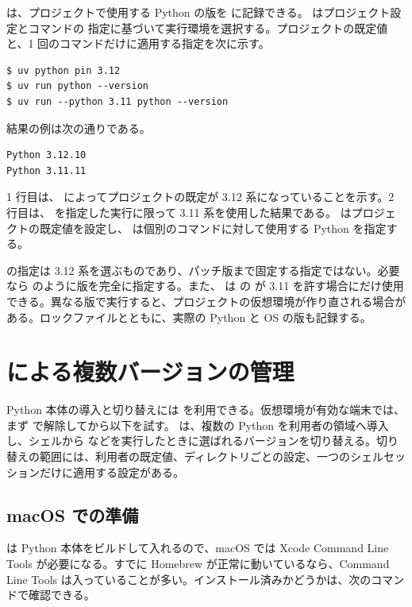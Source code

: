  は、プロジェクトで使用する Python の版を  に記録できる。 はプロジェクト設定とコマンドの  指定に基づいて実行環境を選択する。プロジェクトの既定値と、1 回のコマンドだけに適用する指定を次に示す。

\begin{lstlisting}[numbers=none, xleftmargin=2\zw]
$ uv python pin 3.12
$ uv run python --version
$ uv run --python 3.11 python --version
\end{lstlisting}

結果の例は次の通りである。

\begin{lstlisting}[numbers=none, xleftmargin=2\zw]
Python 3.12.10
Python 3.11.11
\end{lstlisting}

1 行目は、 によってプロジェクトの既定が 3.12 系になっていることを示す。2 行目は、 を指定した実行に限って 3.11 系を使用した結果である。 はプロジェクトの既定値を設定し、 は個別のコマンドに対して使用する Python を指定する。

 の指定は 3.12 系を選ぶものであり、パッチ版まで固定する指定ではない。必要なら  のように版を完全に指定する。また、 は  の  が 3.11 を許す場合にだけ使用できる。異なる版で実行すると、プロジェクトの仮想環境が作り直される場合がある。ロックファイルとともに、実際の Python と OS の版も記録する。

\section{ による複数バージョンの管理}

Python 本体の導入と切り替えには  を利用できる。仮想環境が有効な端末では、まず  で解除してから以下を試す。 は、複数の Python を利用者の領域へ導入し、シェルから  などを実行したときに選ばれるバージョンを切り替える。切り替えの範囲には、利用者の既定値、ディレクトリごとの設定、一つのシェルセッションだけに適用する設定がある。

\subsection{macOS での準備}

 は Python 本体をビルドして入れるので、macOS では Xcode Command Line Tools が必要になる。すでに Homebrew が正常に動いているなら、Command Line Tools は入っていることが多い。インストール済みかどうかは、次のコマンドで確認できる。

